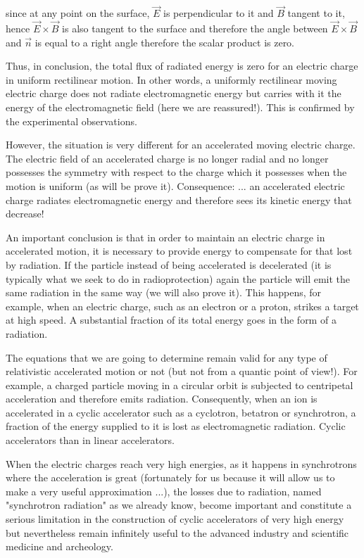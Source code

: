 	since at any point on the surface, $\vec{E}$ is perpendicular to it and $\vec{B}$ tangent to it, hence $\vec{E}\times\vec{B}$ is also tangent to the surface and therefore the angle between $\vec{E}\times\vec{B}$ and $\vec{n}$ is equal to a right angle therefore the scalar product is zero.

	Thus, in conclusion, the total flux of radiated energy is zero for an electric charge in uniform rectilinear motion. In other words, a uniformly rectilinear moving electric charge does not radiate electromagnetic energy but carries with it the energy of the electromagnetic field (here we are reassured!). This is confirmed by the experimental observations.

	However, the situation is very different for an accelerated moving electric charge. The electric field of an accelerated charge is no longer radial and no longer possesses the symmetry with respect to the charge which it possesses when the motion is uniform (as will be prove it). Consequence: ... an accelerated electric charge radiates electromagnetic energy and therefore sees its kinetic energy that decrease!

	An important conclusion is that in order to maintain an electric charge in accelerated motion, it is necessary to provide energy to compensate for that lost by radiation. If the particle instead of being accelerated is decelerated (it is typically what we seek to do in radioprotection) again the particle will emit the same radiation in the same way (we will also prove it). This happens, for example, when an electric charge, such as an electron or a proton, strikes a target at high speed. A substantial fraction of its total energy goes in the form of a radiation.

	The equations that we are going to determine remain valid for any type of relativistic accelerated motion or not (but not from a quantic point of view!). For example, a charged particle moving in a circular orbit is subjected to centripetal acceleration and therefore emits radiation. Consequently, when an ion is accelerated in a cyclic accelerator such as a cyclotron, betatron or synchrotron, a fraction of the energy supplied to it is lost as electromagnetic radiation. Cyclic accelerators than in linear accelerators.
	
	When the electric charges reach very high energies, as it happens in synchrotrons where the acceleration is great (fortunately for us because it will allow us to make a very useful approximation ...), the losses due to radiation, named "synchrotron radiation" as we already know, become important and constitute a serious limitation in the construction of cyclic accelerators of very high energy but nevertheless remain infinitely useful to the advanced industry and scientific medicine and archeology.

